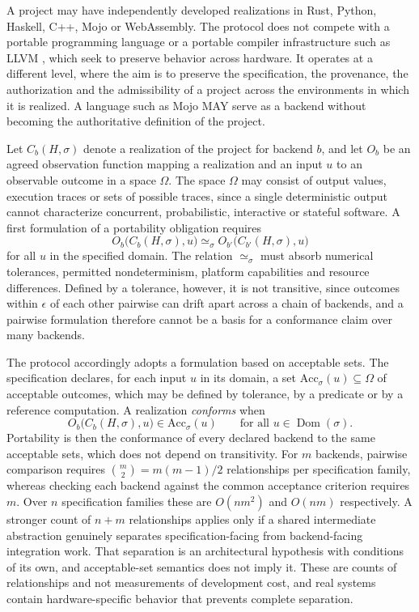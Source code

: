 \documentclass[11pt]{article}
\theoremstyle{remark}
\begin{document}
A project may have independently developed realizations in Rust, Python, Haskell, C++, Mojo or WebAssembly. The protocol does not compete with a portable programming language or a portable compiler infrastructure such as LLVM \cite{llvm}, which seek to preserve behavior across hardware. It operates at a different level, where the aim is to preserve the specification, the provenance, the authorization and the admissibility of a project across the environments in which it is realized. A language such as Mojo MAY serve as a backend without becoming the authoritative definition of the project.

Let $C_b(H,\sigma)$ denote a realization of the project for backend $b$, and let $O_b$ be an agreed observation function mapping a realization and an input $u$ to an observable outcome in a space $\Omega$. The space $\Omega$ may consist of output values, execution traces or sets of possible traces, since a single deterministic output cannot characterize concurrent, probabilistic, interactive or stateful software. A first formulation of a portability obligation requires
\[
O_b\bigl(C_b(H,\sigma),u\bigr)\simeq_\sigma O_{b'}\bigl(C_{b'}(H,\sigma),u\bigr)
\]
for all $u$ in the specified domain. The relation $\simeq_\sigma$ must absorb numerical tolerances, permitted nondeterminism, platform capabilities and resource differences. Defined by a tolerance, however, it is not transitive, since outcomes within $\epsilon$ of each other pairwise can drift apart across a chain of backends, and a pairwise formulation therefore cannot be a basis for a conformance claim over many backends.

The protocol accordingly adopts a formulation based on acceptable sets. The specification declares, for each input $u$ in its domain, a set $\mathrm{Acc}_\sigma(u)\subseteq\Omega$ of acceptable outcomes, which may be defined by tolerance, by a predicate or by a reference computation. A realization \emph{conforms} when
\[
O_b\bigl(C_b(H,\sigma),u\bigr)\in\mathrm{Acc}_\sigma(u)\qquad\text{for all }u\in\operatorname{Dom}(\sigma).
\]
Portability is then the conformance of every declared backend to the same acceptable sets, which does not depend on transitivity. For $m$ backends, pairwise comparison requires $\binom{m}{2}=m(m-1)/2$ relationships per specification family, whereas checking each backend against the common acceptance criterion requires $m$. Over $n$ specification families these are $O(nm^2)$ and $O(nm)$ respectively. A stronger count of $n+m$ relationships applies only if a shared intermediate abstraction genuinely separates specification-facing from backend-facing integration work. That separation is an architectural hypothesis with conditions of its own, and acceptable-set semantics does not imply it. These are counts of relationships and not measurements of development cost, and real systems contain hardware-specific behavior that prevents complete separation.
\end{document}

